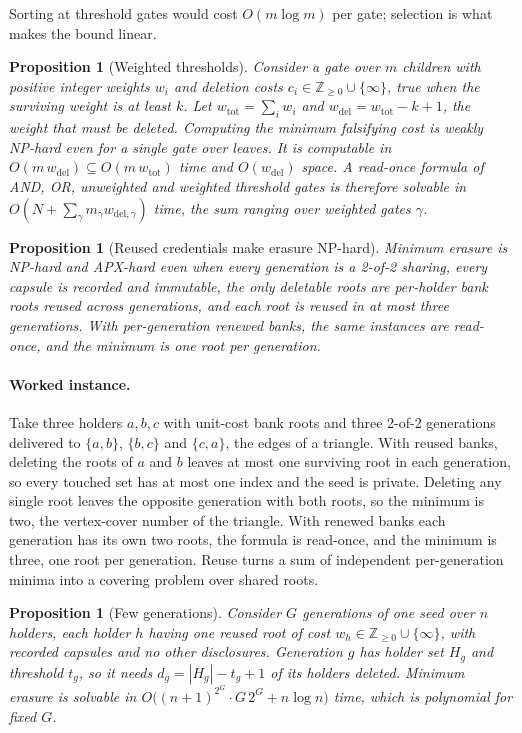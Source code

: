 \documentclass[pdflatex,sn-mathphys-num]{sn-jnl}%
\theoremstyle{plain}
\newtheorem{proposition}[theorem]{Proposition}
\theoremstyle{definition}
\begin{document}
Sorting at threshold gates would cost $O(m\log m)$ per gate; selection is what makes the bound linear.

\begin{proposition}[Weighted thresholds]\label{prop:weighted}
Consider a gate over $m$ children with positive integer weights $w_i$ and deletion costs $c_i\in\mathbb{Z}_{\ge0}\cup\{\infty\}$, true when the surviving weight is at least $k$. Let $w_{\mathrm{tot}}=\sum_iw_i$ and $w_{\mathrm{del}}=w_{\mathrm{tot}}-k+1$, the weight that must be deleted. Computing the minimum falsifying cost is weakly NP-hard even for a single gate over leaves. It is computable in $O(m\,w_{\mathrm{del}})\subseteq O(m\,w_{\mathrm{tot}})$ time and $O(w_{\mathrm{del}})$ space. A read-once formula of AND, OR, unweighted and weighted threshold gates is therefore solvable in $O(N+\sum_{\gamma}m_\gamma w_{\mathrm{del},\gamma})$ time, the sum ranging over weighted gates $\gamma$.
\end{proposition}

\begin{proposition}[Reused credentials make erasure NP-hard]\label{prop:hard}
Minimum erasure is NP-hard and APX-hard even when every generation is a 2-of-2 sharing, every capsule is recorded and immutable, the only deletable roots are per-holder bank roots reused across generations, and each root is reused in at most three generations. With per-generation renewed banks, the same instances are read-once, and the minimum is one root per generation.
\end{proposition}

\paragraph{Worked instance.}
Take three holders $a,b,c$ with unit-cost bank roots and three 2-of-2 generations delivered to $\{a,b\}$, $\{b,c\}$ and $\{c,a\}$, the edges of a triangle. With reused banks, deleting the roots of $a$ and $b$ leaves at most one surviving root in each generation, so every touched set has at most one index and the seed is private. Deleting any single root leaves the opposite generation with both roots, so the minimum is two, the vertex-cover number of the triangle. With renewed banks each generation has its own two roots, the formula is read-once, and the minimum is three, one root per generation. Reuse turns a sum of independent per-generation minima into a covering problem over shared roots.

\begin{proposition}[Few generations]\label{prop:fewgen}
Consider $G$ generations of one seed over $n$ holders, each holder $h$ having one reused root of cost $w_h\in\mathbb{Z}_{\ge0}\cup\{\infty\}$, with recorded capsules and no other disclosures. Generation $g$ has holder set $H_g$ and threshold $t_g$, so it needs $d_g=|H_g|-t_g+1$ of its holders deleted. Minimum erasure is solvable in $O\big((n+1)^{2^G}\cdot G\,2^G+n\log n\big)$ time, which is polynomial for fixed $G$.
\end{proposition}
\end{document}
